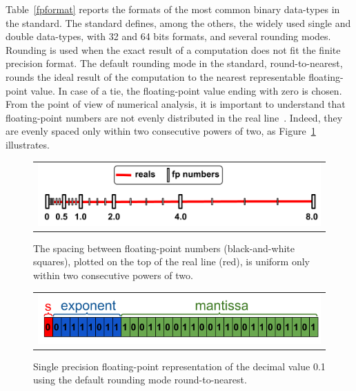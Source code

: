 %
Table~\ref{fpformat} reports the formats of the most common binary data-types in the standard.
%
The standard defines, among the others, the widely used single and double data-types, with 32 and 64 bits formats, and several rounding modes.
%
Rounding is used when the exact result of a computation does not fit the finite precision format.
%
The default rounding mode in the standard, round-to-nearest, rounds the ideal result of the computation to the nearest representable floating-point value.
%
In case of a tie, the floating-point value ending with zero is chosen.
%
From the point of view of numerical analysis, it is important to understand that floating-point numbers are not evenly distributed in the real line~\cite{every}.
%
%
Indeed, they are evenly spaced only within two consecutive powers of two, as Figure~\ref{fig:line} illustrates.

%
\begin{figure}[tb!]
	\centering
	\begin{tabular}{l}
		\includegraphics[width=1.0\textwidth]{pic/fpnumbers.png}
	\end{tabular}
	\caption{The spacing between floating-point numbers (black-and-white squares), plotted on the top of the real line (red), is uniform only within two consecutive powers of two.}
	\label{fig:line}
\end{figure}
%
\begin{figure}[tb!]
	\centering
	\begin{tabular}{l}
		\includegraphics[width=1.0\textwidth]{pic/examplenumber.png}
	\end{tabular}
	\caption{Single precision floating-point representation of the decimal value 0.1 using the default rounding mode round-to-nearest.}
	\label{fig:zeropointone}
\end{figure}
%

